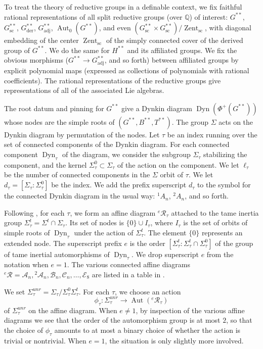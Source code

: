 \documentclass[12pt]{amsart}
\newcommand{\op}[1]{\operatorname{#1}}
\newcommand{\ring}[1]{{\mathbb #1}}
\newcommand{\cal}[1]{\mathcal{#1}}
\def\R{\cal{R}}
\theoremstyle{plain}
\theoremstyle{definition}
\begin{document}
To treat the theory of reductive groups in a definable context, we fix
faithful rational representations of all split reductive groups (over
$\ring{Q}$) of interest: $G^{**}$, $G^{**}_{\text{sc}}$, $G^{**}_{\text{der}}$,
$G^{**}_{\text{adj}}$,
$\op{Aut}_0(G^{**})$, and even $(G^{**}_{\text{sc}}\times
G^{**}_{\text{sc}})/\op{Zent}_{\text{sc}}$, with diagonal embedding of the center
$\op{Zent}_{\text{sc}}$ of the simply connected cover of the derived group of
$G^{**}$.  We do the same for $H^{**}$ and its affiliated groups.  We
fix the obvious morphisms ($G^{**}\to G^{**}_{\text{adj}}$, and so forth)
between affiliated groups by explicit polynomial maps (expressed as
collections of polynomials with rational coefficients).  The rational
representations of the reductive groups give
representations of all of the associated Lie algebras.

The root datum and pinning for $G^{**}$ give a Dynkin diagram
$\op{Dyn}(\Phi^+(G^{**}))$ whose nodes are the simple roots of
$(G^{**},B^{**},T^{**})$.  The group $\Sigma$ acts on the Dynkin
diagram by permutation of the nodes.  Let $\tau$ be an index running
over the set of connected components of the Dynkin diagram.  For each
connected component $\op{Dyn}_\tau$ of the diagram, we consider the
subgroup $\Sigma_\tau$ stabilizing the component, and the kernel
$\Sigma^0_\tau\subset \Sigma_\tau$ of the action on the component.  We
let $\ell_\tau$ be the number of connected components in the $\Sigma$
orbit of $\tau$.  We let $d_\tau = [\Sigma_\tau:\Sigma_\tau^0]$ be the
index.  We add the prefix superscript $d_\tau$ to the symbol for the
connected Dynkin diagram in the usual way: ${}^1A_n$, ${}^2A_n$, and
so forth.

Following \cites{reeder2010torsion, Gross}, for each $\tau$, we
form an affine diagram ${}^e\R_\tau$ attached to the tame inertia
group $\Sigma^t_\tau = \Sigma^t\cap \Sigma_\tau$.  Its set of nodes is
$\{0\}\cup I_\tau$, where $I_\tau$ is the set of orbits of simple
roots of $\op{Dyn}_\tau$ under the action of $\Sigma^t_\tau$.  The
element $\{0\}$ represents an extended node.  The superscript prefix
$e$ is the order $[\Sigma^t_\tau:\Sigma^t_\tau\cap \Sigma_\tau^0]$ of
the group of tame inertial automorphisms of $\op{Dyn}_\tau$.  We drop
superscript $e$ from the notation when $e=1$.  The various connected
affine diagrams ${}^e\R = \cal{A}_n, {}^2\cal{A}_n, \cal{B}_n,
\cal{C}_n,\ldots, \cal{E}_8$ are listed in a table in \cite{Gross}.

We set $\Sigma^{unr}_\tau = \Sigma_\tau/\Sigma_\tau^0\Sigma^t_\tau$.
For each $\tau$, we choose an action
\[
\phi_\tau:\Sigma^{unr}_\tau\to \op{Aut}({}^e\R_\tau)
\]
of $\Sigma^{unr}_\tau$ on the affine diagram.  When $e\ne 1$, by
inspection of the various affine diagrams we see that the order of the
automorphism group is at most $2$, so that the choice of $\phi_\tau$
amounts to at most a binary choice of whether the action is trivial or
nontrivial.  When $e=1$, the situation is only slightly more
involved.
\end{document}
